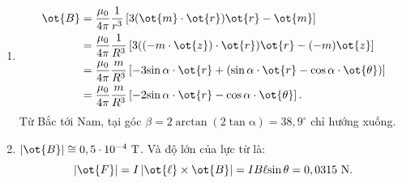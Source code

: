 \begin{vd}
\begin{center}
\end{center}
\end{vd}
\begin{loigiai}
\begin{enumerate}[1) ]
    \item 
    \begin{align*}
        \ot{B}&=\dfrac{\mu_0}{4\pi}\dfrac{1}{r^3}\left[3(\ot{m}\cdot\ot{r})\ot{r}-\ot{m}\right]\\
        &=\dfrac{\mu_0}{4\pi}\dfrac{1}{R^3}\left[3((-m\cdot\ot{z})\cdot\ot{r})\ot{r}-(-m)\ot{z}\right]\\
        &=\dfrac{\mu_0}{4\pi}\dfrac{m}{R^3}\left[-3\mathrm{\sin{\alpha}}\cdot\ot{r}+\left(\mathrm{\sin{\alpha}}\cdot\ot{r}-\mathrm{\cos{\alpha}}\cdot\ot{\theta}\right)\right]\\
        &=\dfrac{\mu_0}{4\pi}\dfrac{m}{R^3}\left[-2\mathrm{\sin{\alpha}}\cdot\ot{r}-\mathrm{\cos{\alpha}}\cdot\ot{\theta}\right].
    \end{align*}
    Từ Bắc tới Nam, tại góc $\beta=2\mathrm{\arctan{(2\mathrm{\tan{\alpha}})}}=38,9^\circ$ chỉ hướng xuống.
    \item $\left|\ot{B}\right|\cong0,5\cdot10^{-4}~\mathrm{T}$.
    Và độ lớn của lực từ là:
    \[\left|\ot{F}\right|=I\left|\ot{\ell}\times\ot{B}\right|=IB\ell\mathrm{\sin{\theta}}=0,0315~\mathrm{N}.\]
\end{enumerate}
\end{loigiai}